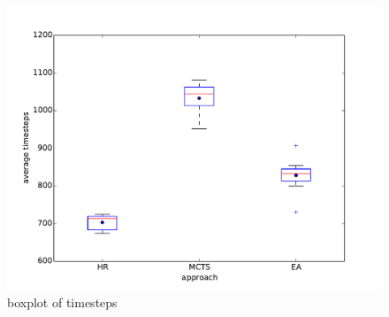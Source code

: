 \begin{figure}
\begin{minipage}{1\textwidth}
\includegraphics[scale=0.3]{images/eval_all_timesteps.pdf}
\caption{boxplot of timesteps}
\label{fig:eval_all_timesteps}
\end{minipage}
\end{figure}


